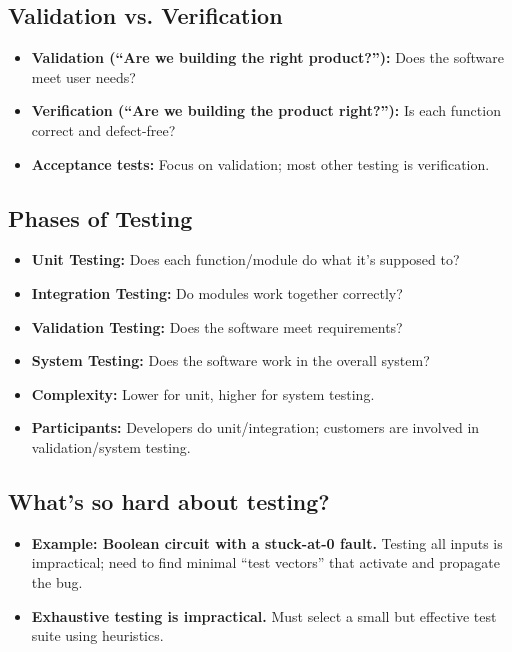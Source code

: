 \documentclass[11pt,a4paper]{article}
\begin{document}
\subsection*{Validation vs. Verification}
\begin{itemize}
    \item \textbf{Validation (“Are we building the right product?”):} Does the software meet user needs?
    \item \textbf{Verification (“Are we building the product right?”):} Is each function correct and defect-free?
    \item \textbf{Acceptance tests:} Focus on validation; most other testing is verification.
\end{itemize}

\subsection*{Phases of Testing}
\begin{itemize}
    \item \textbf{Unit Testing:} Does each function/module do what it’s supposed to?
    \item \textbf{Integration Testing:} Do modules work together correctly?
    \item \textbf{Validation Testing:} Does the software meet requirements?
    \item \textbf{System Testing:} Does the software work in the overall system?
    \item \textbf{Complexity:} Lower for unit, higher for system testing.
    \item \textbf{Participants:} Developers do unit/integration; customers are involved in validation/system testing.
\end{itemize}

\subsection*{What’s so hard about testing?}
\begin{itemize}
    \item \textbf{Example: Boolean circuit with a stuck-at-0 fault.} Testing all inputs is impractical; need to find minimal “test vectors” that activate and propagate the bug.
    \item \textbf{Exhaustive testing is impractical.} Must select a small but effective test suite using heuristics.
\end{itemize}
\end{document}
